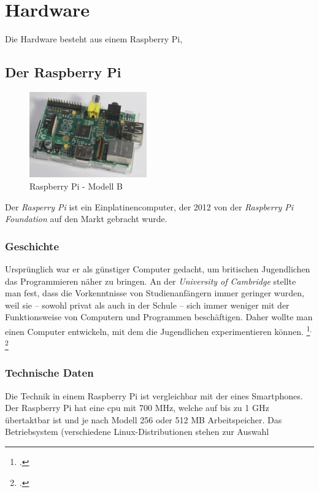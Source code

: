 
\chapter{Hardware}

Die Hardware besteht aus einem Raspberry Pi, 
\section{Der Raspberry Pi}
\begin{figure}
 \vspace{-16pt}
 \centering 
 \includegraphics[width=0.45\textwidth]{figures/raspberry.jpg}
 \caption[Raspberry Pi - Modell B]{Raspberry Pi - Modell B\footnotemark}
 \vspace{-50pt}
\end{figure}
Der \textit{Rasperry Pi} ist ein Einplatinencomputer, der 2012 von der  \textit{Raspberry Pi Foundation} auf den Markt gebracht wurde. 
\subsection{Geschichte}
Ursprünglich war er als günstiger Computer gedacht, um britischen Jugendlichen das Programmieren näher zu bringen. An der \textit{University of Cambridge} stellte man fest, dass die Vorkenntnisse von Studienanfängern immer geringer wurden, weil sie -- sowohl privat als auch in der Schule -- sich immer weniger mit der Funktionsweise von Computern und Programmen beschäftigen. Daher wollte man einen Computer entwickeln, mit dem die Jugendlichen experimentieren können.
\footcite{aboutraspberry}$^,$
\footcite{wiki:raspi_geschichte}

\subsection{Technische Daten}
Die Technik in einem Raspberry Pi ist vergleichbar mit der eines Smartphones. Der Raspberry Pi hat eine \acrshort{cpu} mit 700 MHz, welche auf bis zu 1 GHz übertaktbar ist und je nach Modell 256 oder 512 MB Arbeitspeicher. Das Betriebsystem (verschiedene Linux-Distributionen stehen zur Auswahl